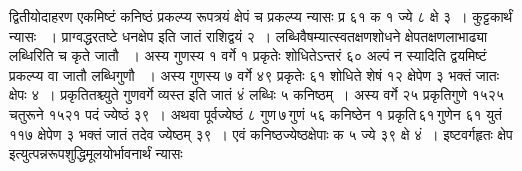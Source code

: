 \documentclass[11pt, openany]{book}
\begin{document}
\begin{sloppypar}

\noindent द्वितीयोदाहरण एकमिष्टं कनिष्ठं प्रकल्प्य रूपत्रयं क्षेपं च प्रकल्प्य न्यासः प्र ६१ क १ ज्ये ८ क्षे ३~। कुट्टकार्थं न्यासः ~। प्राग्वद्धरतष्टे धनक्षेप इति जातं राशिद्वयं २~। लब्धिवैषम्यात्स्वतक्षणशोधने क्षेपतक्षणलाभाढ्या लब्धिरिति च कृते जातौ ~। अस्य गुणस्य १ वर्गे १ प्रकृतेः शोधितेऽन्तरं ६० अल्पं न स्यादिति द्वयमिष्टं प्रकल्प्य वा जातौ लब्धिगुणौ ~। अस्य गुणस्य ७ वर्गे ४९ प्रकृतेः ६१ शोधिते शेषं १२ क्षेपेण ३ भक्तं जातः क्षेपः ४~। प्रकृतितश्च्युते गुणवर्गे व्यस्त इति जातं ४ं लब्धिः ५ कनिष्ठम्~। अस्य वर्गे २५ प्रकृतिगुणे १५२५ चतुरूने १५२१ पदं ज्येष्ठं ३९~। अथवा पूर्वज्येष्ठं ८ गुण\textendash \,७\textendash \,गुणं ५६ कनिष्ठेन १ प्रकृति\textendash \,६१\textendash \,गुणेन ६१ युतं ११७ क्षेपेण ३ भक्तं जातं तदेव ज्येष्ठम् ३९~। एवं कनिष्ठज्येष्ठक्षेपाः क ५ ज्ये ३९ क्षे ४ं~। इष्टवर्गहृतः क्षेप इत्युत्पन्नरूपशुद्धिमूलयोर्भावनार्थं न्यासः 
\end{sloppypar}
\end{document}
